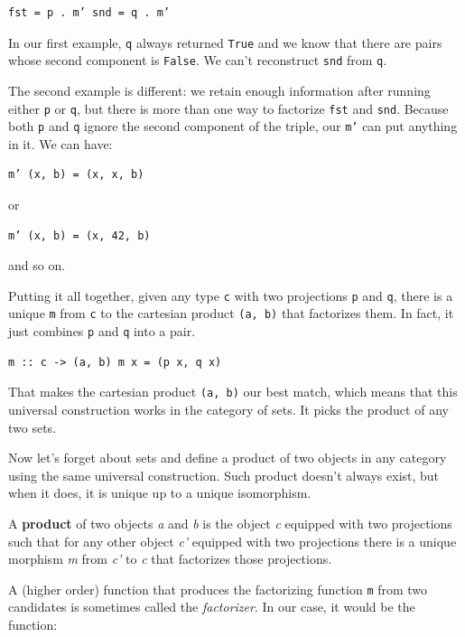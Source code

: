 \begin{verbatim}
fst = p . m’ snd = q . m’
\end{verbatim}

In our first example, \texttt{q} always returned \texttt{True} and we
know that there are pairs whose second component is \texttt{False}. We
can't reconstruct \texttt{snd} from \texttt{q}.

The second example is different: we retain enough information after
running either \texttt{p} or \texttt{q}, but there is more than one way
to factorize \texttt{fst} and \texttt{snd}. Because both \texttt{p} and
\texttt{q} ignore the second component of the triple, our \texttt{m’}
can put anything in it. We can have:

\begin{verbatim}
m’ (x, b) = (x, x, b)
\end{verbatim}

or

\begin{verbatim}
m’ (x, b) = (x, 42, b)
\end{verbatim}

and so on.

Putting it all together, given any type \texttt{c} with two projections
\texttt{p} and \texttt{q}, there is a unique \texttt{m} from \texttt{c}
to the cartesian product \texttt{(a,\ b)} that factorizes them. In fact,
it just combines \texttt{p} and \texttt{q} into a pair.

\begin{verbatim}
m :: c -> (a, b) m x = (p x, q x)
\end{verbatim}

That makes the cartesian product \texttt{(a,\ b)} our best match, which
means that this universal construction works in the category of sets. It
picks the product of any two sets.

Now let's forget about sets and define a product of two objects in any
category using the same universal construction. Such product doesn't
always exist, but when it does, it is unique up to a unique isomorphism.

A \textbf{product} of two objects \emph{a} and \emph{b} is the object
\emph{c} equipped with two projections such that for any other object
\emph{c'} equipped with two projections there is a unique morphism
\emph{m} from \emph{c'} to \emph{c} that factorizes those projections.

A (higher order) function that produces the factorizing function
\texttt{m} from two candidates is sometimes called the
\emph{factorizer}. In our case, it would be the function:

